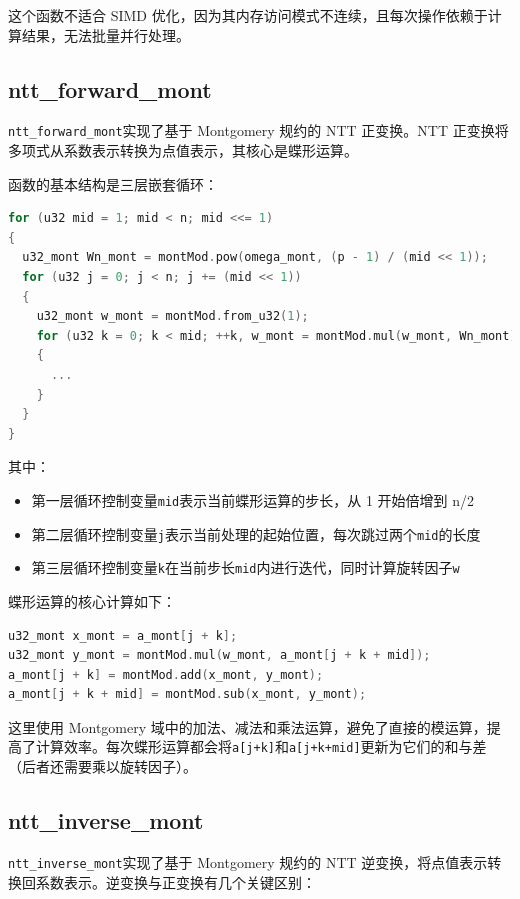 \documentclass[a4paper]{article}
\begin{document}
这个函数不适合 SIMD 优化，因为其内存访问模式不连续，且每次操作依赖于计算结果，无法批量并行处理。

\subsection{ntt\_forward\_mont}

\texttt{ntt\_forward\_mont}实现了基于 Montgomery 规约的 NTT 正变换。NTT 正变换将多项式从系数表示转换为点值表示，其核心是蝶形运算。

函数的基本结构是三层嵌套循环：

\begin{lstlisting}[language=C++]
for (u32 mid = 1; mid < n; mid <<= 1)
{
  u32_mont Wn_mont = montMod.pow(omega_mont, (p - 1) / (mid << 1));
  for (u32 j = 0; j < n; j += (mid << 1))
  {
    u32_mont w_mont = montMod.from_u32(1);
    for (u32 k = 0; k < mid; ++k, w_mont = montMod.mul(w_mont, Wn_mont))
    {
      ...
    }
  }
}
\end{lstlisting}

其中：

\begin{itemize}
  \item 第一层循环控制变量\texttt{mid}表示当前蝶形运算的步长，从 1 开始倍增到 n/2
  \item 第二层循环控制变量\texttt{j}表示当前处理的起始位置，每次跳过两个\texttt{mid}的长度
  \item 第三层循环控制变量\texttt{k}在当前步长\texttt{mid}内进行迭代，同时计算旋转因子\texttt{w}
\end{itemize}

蝶形运算的核心计算如下：

\begin{lstlisting}[language=C++]
u32_mont x_mont = a_mont[j + k];
u32_mont y_mont = montMod.mul(w_mont, a_mont[j + k + mid]);
a_mont[j + k] = montMod.add(x_mont, y_mont);
a_mont[j + k + mid] = montMod.sub(x_mont, y_mont);
\end{lstlisting}

这里使用 Montgomery 域中的加法、减法和乘法运算，避免了直接的模运算，提高了计算效率。每次蝶形运算都会将\texttt{a[j+k]}和\texttt{a[j+k+mid]}更新为它们的和与差（后者还需要乘以旋转因子）。

\subsection{ntt\_inverse\_mont}

\texttt{ntt\_inverse\_mont}实现了基于 Montgomery 规约的 NTT 逆变换，将点值表示转换回系数表示。逆变换与正变换有几个关键区别：
\end{document}
